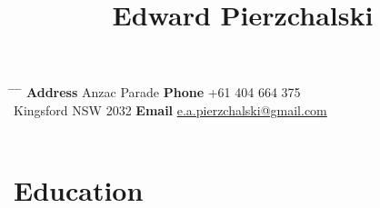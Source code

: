\documentclass[10pt]{article} %
\begin{document}

\title{Edward Pierzchalski} %

\begin{tabbing}
 \hspace{2cm} \= \hspace{6cm} \= \hspace{2cm} \= \kill
 {\bf Address}  Anzac Parade \> {\bf Phone} \> +61 404 664 375 \\
 \> Kingsford NSW 2032 \> {\bf Email} \> \href{mailto:e.a.pierzchalski@gmail.com}{e.a.pierzchalski@gmail.com} \\\\
\end{tabbing}
\vspace{-40pt}


\section{Education}
\end{document}
